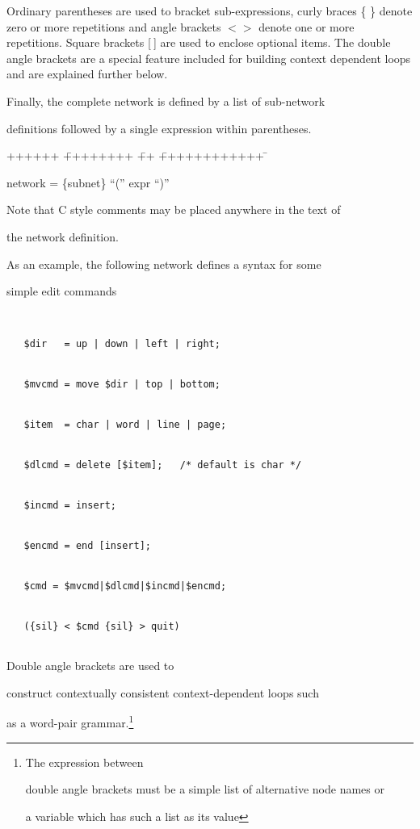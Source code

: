 Ordinary parentheses are used to bracket sub-expressions, curly braces \{ \} denote zero or more repetitions and angle brackets $<>$ denote one or more repetitions.  Square brackets [$\:$] are used to enclose optional items.  The double angle brackets are a special feature included for building context dependent loops and are explained further below.


Finally, the complete network is defined by a list of sub-network


definitions followed by a single expression within parentheses.


{\sf


\begin{tabbing}


++++++ \= ++++++++ \= ++ \= ++++++++++++ \=  \kill


\>    network \> = \> \{subnet\} ``('' expr ``)''


\end{tabbing}}


\noindent


Note that C style comments may be placed anywhere in the text of


the network definition.





As an example, the following network defines a syntax for some


simple edit commands


\begin{verbatim}


   $dir   = up | down | left | right;


   $mvcmd = move $dir | top | bottom;      


   $item  = char | word | line | page;


   $dlcmd = delete [$item];   /* default is char */


   $incmd = insert;


   $encmd = end [insert];


   $cmd = $mvcmd|$dlcmd|$incmd|$encmd;


   ({sil} < $cmd {sil} > quit)


\end{verbatim}





Double angle brackets are used to


construct contextually consistent context-dependent loops such


as a word-pair grammar.\footnote{The expression between 


double angle brackets must be a simple list of alternative node names or


a variable which has such a list as its value}



